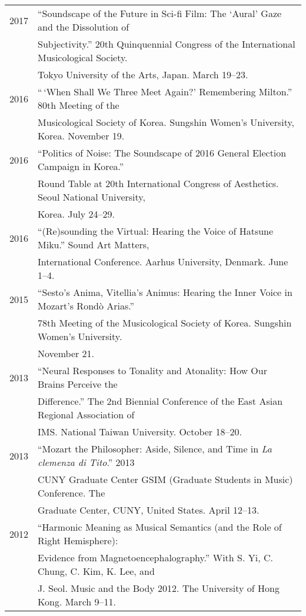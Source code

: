 \documentclass[a4paper,11pt,draft]{article}
\begin{document}
  \hspace*{-0.25cm}
  \begin{tabular}{p{2.5cm} p{12.5cm}}
  2017 & ``Soundscape of the Future in Sci-fi Film: The ‘Aural’ Gaze and the Dissolution of\\
  & Subjectivity.'' 20th Quinquennial Congress of the International Musicological Society.\\
  & Tokyo University of the Arts, Japan. March 19--23.\\[2mm]
  
  2016 & ``\,`When Shall We Three Meet Again?' Remembering Milton.'' 80th Meeting of the\\
  & Musicological Society of Korea. Sungshin Women's University, Korea. November 19.\\[2mm]
  
  2016 & ``Politics of Noise: The Soundscape of 2016 General Election Campaign in Korea.''\\
  & Round Table at 20th International Congress of Aesthetics. Seoul National University,\\
  & Korea. July 24--29.\\[2mm]
  
  2016 & ``(Re)sounding the Virtual: Hearing the Voice of Hatsune Miku.'' Sound Art Matters,\\
  & International Conference. Aarhus University, Denmark. June 1--4.\\[2mm]
  
  2015 & ``Sesto's Anima, Vitellia's Animus: Hearing the Inner Voice in Mozart’s Rond\`{o} Arias.''\\
  & 78th Meeting of the Musicological Society of Korea. Sungshin Women's University.\\
  & November 21.\\[2mm]
  
  2013 & “Neural Responses to Tonality and Atonality: How Our Brains Perceive the\\
  & Difference.” The 2nd Biennial Conference of the East Asian Regional Association of\\
  & IMS. National Taiwan University. October 18–20.\\[2mm]

  2013 & “Mozart the Philosopher: Aside, Silence, and Time in \textit{La clemenza di Tito}.” 2013\\
  & CUNY Graduate Center GSIM (Graduate Students in Music) Conference. The\\
  & Graduate Center, CUNY, United States. April 12–13.\\[2mm]

  2012 & “Harmonic Meaning as Musical Semantics (and the Role of Right Hemisphere):\\
  & Evidence from Magnetoencephalography.” With S. Yi, C. Chung, C. Kim, K. Lee, and\\
  & J. Seol. Music and the Body 2012. The University of Hong Kong. March 9–11.
  \end{tabular}
  
\end{document}
